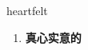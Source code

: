 
\begin{frame}
{\huge heartfelt}
\begin{center}
\begin{enumerate}\Large
  \item \textbf{真心实意的}
\end{enumerate}
\end{center}
\end{frame}
